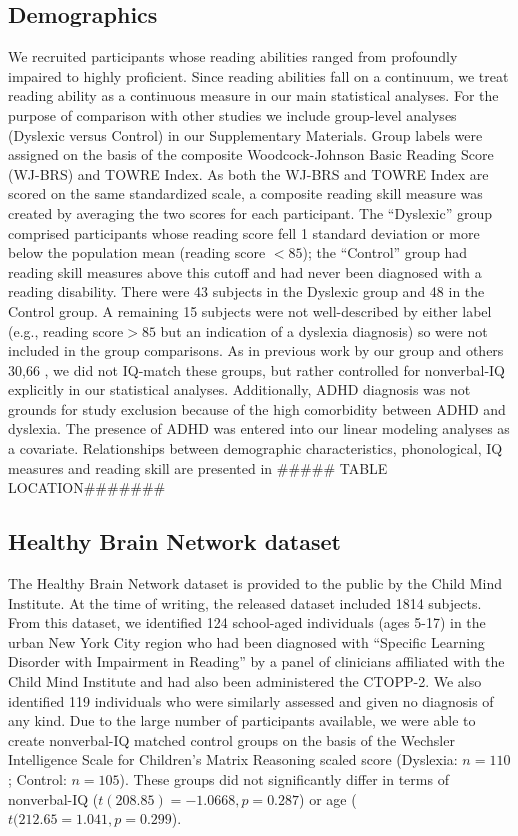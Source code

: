 \documentclass[../uwthesis.tex]{subfiles}
\begin{document}
\subsection{Demographics}
We recruited participants whose reading abilities ranged from profoundly impaired to highly proficient. Since reading abilities fall on a continuum, we treat reading ability as a
continuous measure in our main statistical analyses. For the purpose of comparison with other studies we include group-level analyses (Dyslexic versus Control) in our Supplementary Materials. Group labels were assigned on the basis of the composite Woodcock-Johnson Basic Reading Score
(WJ-BRS) and TOWRE Index. As both the WJ-BRS and TOWRE Index are scored on the same standardized scale, a composite reading skill measure was created by averaging the two scores for
each participant. The “Dyslexic” group comprised participants whose reading score fell 1 standard deviation or more below the population mean (reading score $<85$); the “Control” group had
reading skill measures above this cutoff and had never been diagnosed with a reading disability. There were 43 subjects in the Dyslexic group and 48 in the Control group. A remaining 15 subjects were not well-described by either label (e.g., reading score$>85$ but an indication of a dyslexia
diagnosis) so were not included in the group comparisons. As in previous work by our group and others 30,66 , we did not IQ-match these groups, but rather controlled for nonverbal-IQ explicitly in our statistical analyses. Additionally, ADHD diagnosis was not grounds for study exclusion because of the high comorbidity between ADHD and dyslexia. The presence of ADHD was
entered into our linear modeling analyses as a covariate. Relationships between demographic characteristics, phonological, IQ measures and reading skill are presented in ##### TABLE LOCATION#######

\subsection{Healthy Brain Network dataset}
The Healthy Brain Network dataset is provided to the public by the Child Mind Institute. At the time of writing, the released dataset included 1814 subjects. From this dataset, we identified
124 school-aged individuals (ages 5-17) in the urban New York City region who had been diagnosed with “Specific Learning Disorder with Impairment in Reading” by a panel of clinicians affiliated with the Child Mind Institute and had also been administered the CTOPP-2. We also identified 119 individuals who were similarly assessed and given no diagnosis of any kind. Due to the large number of participants available, we were able to create nonverbal-IQ matched control groups on the basis of the Wechsler Intelligence Scale for Children’s Matrix Reasoning scaled score (Dyslexia: $n = 110$; Control: $n = 105$). These groups did not significantly differ in terms of
nonverbal-IQ ($t(208.85) = -1.0668, p = 0.287$) or age ($t(212.65 = 1.041, p = 0.299$).
\end{document}
